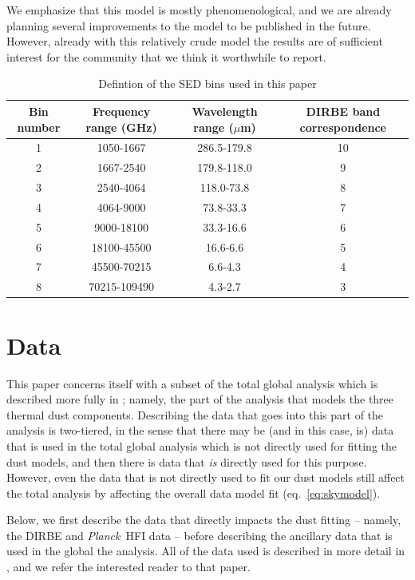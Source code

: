 \documentclass{aa}
\def\Planck{\textit{Planck}}
\begin{document}
We emphasize that this model is mostly phenomenological, and we are already
planning several improvements to the model to be published in the future.
However, already with this relatively crude model the results are of sufficient
interest for the community that we think it worthwhile to report.

\begin{table}
    \centering
    \caption{Defintion of the SED bins used in this paper}
    \begin{tabular}{c|c|c|c}
        \label{tab:bins}
        Bin number & Frequency range (GHz) & Wavelength range ($\mu$m) & DIRBE band correspondence \\
        \hline
        1 & 1050-1667 & 286.5-179.8 & 10 \\
        2 & 1667-2540 & 179.8-118.0 & 9 \\
        3 & 2540-4064 & 118.0-73.8 & 8 \\
        4 & 4064-9000 & 73.8-33.3 & 7 \\
        5 & 9000-18100 & 33.3-16.6 & 6 \\
        6 & 18100-45500 & 16.6-6.6 & 5  \\
        7 & 45500-70215 & 6.6-4.3 & 4 \\
        8 & 70215-109490 & 4.3-2.7 & 3
    \end{tabular}
\end{table}

\section{Data}
\label{sec:data}
This paper concerns itself with a subset of the total global analysis which is
described more fully in \cite{CG02_01}; namely, the part of the analysis that
models the three thermal dust components. Describing the data that goes into
this part of the analysis is two-tiered, in the sense that there may be (and in
this case, is) data that is used in the total global analysis which is not
directly used for fitting the dust models, and then there is data that
\emph{is} directly used for this purpose. However, even the data that is not
directly used to fit our dust models still affect the total analysis by
affecting the overall data model fit (eq.~\ref{eq:skymodel}).

Below, we first describe the data that directly impacts the dust fitting --
namely, the DIRBE and \Planck\ HFI data -- before describing the ancillary data
that is used in the global the analysis. All of the data used is described in
more detail in \cite{CG02_01}, and we refer the interested reader to that
paper.
\end{document}
